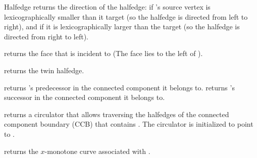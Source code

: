 \begin{ccRefClass}{Halfedge}
    {returns the direction of the halfedge:  if \ccVar{}'s
     source vertex is lexicographically smaller than it target (so the
     halfedge is directed from left to right), and  if it is
     lexicographically larger than the target (so the halfedge is directed
     from right to left).}

    {returns the face that \ccVar{} is incident to (The face lies to
    the left of ).}

    {returns the twin halfedge.}

    {returns \ccVar{}'s predecessor in the connected component it belongs to.}
\ccGlue
{}
    {returns \ccVar{}'s successor in the connected component it belongs to.}

    {returns a circulator that allows traversing the halfedges of the
     connected component boundary (CCB) that contains \ccVar{}.
     The circulator is initialized to point to \ccVar{}.}

    {returns the $x$-monotone curve associated with \ccVar{}.
     }

\end{ccRefClass}

\ccRefPageEnd
